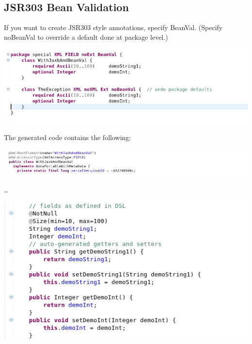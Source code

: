 \documentclass[11pt,a4paper,oneside]{article}
\begin{document}
\subsection{JSR303 Bean Validation}
If you want to create JSR303 style annotations, specify {\ttfamily BeanVal}. (Specify {\ttfamily noBeanVal} to
override a default done at package level.)

\vspace{2mm}

\hspace{1cm}\includegraphics[scale=0.5]{images/tut1-012-special.png}

\noindent The generated code contains the following:

\vspace{2mm}

\hspace{1cm}\includegraphics[scale=0.5]{images/tut1-012-special-1.png}

\ldots

\vspace{2mm}

\hspace{1cm}\includegraphics[scale=0.5]{images/tut1-012-special-2.png}
\end{document}

